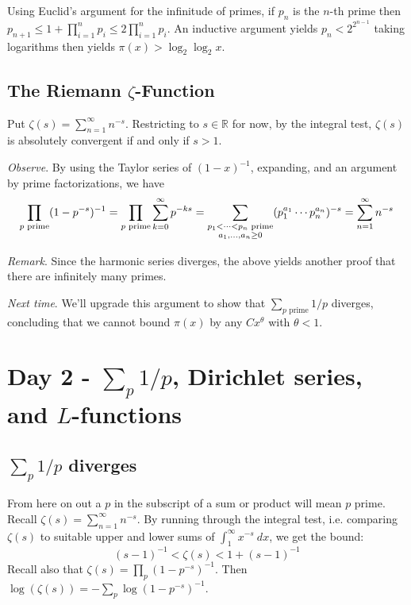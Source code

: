 \documentclass[12pt]{article}
\newcommand{\reals}{\mathbb{R}}
\numberwithin{equation}{section}
\numberwithin{thm}{section}
\numberwithin{lemma}{section}
\begin{document}
Using Euclid's argument for the infinitude of primes, if $p_n$ is the $n$-th prime then $p_{n + 1} \leq 1 + \prod_{i = 1}^n p_i \leq 2 \prod_{i = 1}^n p_i$. An inductive argument yields $p_n < 2^{2^{n-1}}$ taking logarithms then yields $\pi(x) > \log_2 \log_2 x$.

\subsection{The Riemann $\zeta$-Function}

Put $\zeta(s) = \sum_{n = 1}^{\infty} n^{-s}$. Restricting to $s \in \reals$ for now, by the integral test, $\zeta(s)$ is absolutely convergent if and only if $s > 1$. 

\textit{Observe}. By using the Taylor series of $(1 - x)^{-1}$, expanding, and an argument by prime factorizations, we have \[\prod_{p \text{ prime}} (1 - p^{-s})^{-1} = \prod_{p \text{ prime}} \sum_{k = 0}^{\infty} p^{-ks} = \sum_{\underset{\mathlarger{a_1, ..., a_n \geq 0}}{p_1 < \cdots < p_n \text{ prime}}} (p_1^{a_1} \cdots p_n^{a_n})^{-s} = \sum_{n = 1}^{\infty} n^{-s}\]

\textit{Remark}. Since the harmonic series diverges, the above yields another proof that there are infinitely many primes.

\textit{Next time}. We'll upgrade this argument to show that $\sum_{p \text{ prime}} 1/p$ diverges, concluding that we cannot bound $\pi(x)$ by any $C x^{\theta}$ with $\theta < 1$.

\section{Day 2 - $\sum_p 1/p$, Dirichlet series, and $L$-functions}

\subsection{$\sum_p 1/p$ diverges}

From here on out a $p$ in the subscript of a sum or product will mean $p$ prime. Recall $\zeta(s) = \sum_{n = 1}^{\infty} n^{-s}$. By running through the integral test, i.e. comparing $\zeta(s)$ to suitable upper and lower sums of $\int_1^{\infty} x^{-s} \ dx$, we get the bound: \begin{equation}\label{ZetaInequality1}(s - 1)^{-1} < \zeta(s) < 1 + (s - 1)^{-1}\end{equation} Recall also that $\zeta(s) = \prod_p (1 - p^{-s})^{-1}$. Then $\log (\zeta (s)) = - \sum_p \log (1 - p^{-s})^{-1}$.
\end{document}
